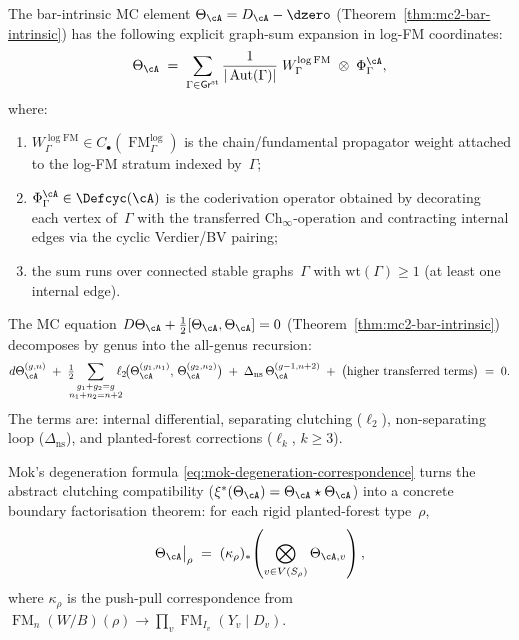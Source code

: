 \begin{construction}
\label{const:vol1-graph-sum-theta-logfm}
The bar-intrinsic MC element $\Theta_\cA = D_\cA - \dzero$
(Theorem~\ref{thm:mc2-bar-intrinsic}) has the following explicit
graph-sum expansion in log-FM coordinates:
\begin{equation}\label{eq:theta-graph-sum-logfm}
\Theta_\cA
\;=\;
\sum_{\Gamma \in \mathsf{Gr}^{\mathrm{st}}}
\frac{1}{|\operatorname{Aut}(\Gamma)|}
\;W_\Gamma^{\log\mathrm{FM}}
\;\otimes\;
\Phi_\Gamma^\cA,
\end{equation}
where:
\begin{enumerate}[label=\textup{(\alph*)}]
\item $W_\Gamma^{\log\mathrm{FM}} \in
  C_\bullet(\operatorname{FM}^{\log}_\Gamma)$ is the
  chain/fundamental propagator weight attached to the log-FM
  stratum indexed by~$\Gamma$;
\item $\Phi_\Gamma^\cA \in \Defcyc(\cA)$ is the coderivation
  operator obtained by decorating each vertex of~$\Gamma$ with the
  transferred $\mathrm{Ch}_\infty$-operation and contracting
  internal edges via the cyclic Verdier/BV pairing;
\item the sum runs over connected stable graphs~$\Gamma$ with
  $\mathrm{wt}(\Gamma) \geq 1$ (at least one internal edge).
\end{enumerate}
The MC equation $D\Theta_\cA + \tfrac{1}{2}[\Theta_\cA,\Theta_\cA]
= 0$ \textup{(}Theorem~\textup{\ref{thm:mc2-bar-intrinsic})}
decomposes by genus into the all-genus recursion:
\begin{equation}\label{eq:all-genus-recursion-logfm}
d\Theta_\cA^{(g,n)}
\;+\;
\tfrac{1}{2}
\!\!\!\!
\sum_{\substack{g_1 + g_2 = g \\ n_1 + n_2 = n + 2}}
\!\!\!\!
\ell_2\!\bigl(\Theta_\cA^{(g_1,n_1)},\,
\Theta_\cA^{(g_2,n_2)}\bigr)
\;+\;
\Delta_{\mathrm{ns}}\, \Theta_\cA^{(g-1,n+2)}
\;+\;
\bigl(\text{higher transferred terms}\bigr)
\;=\; 0.
\end{equation}
The terms are: internal differential, separating clutching
($\ell_2$), non-separating loop ($\Delta_{\mathrm{ns}}$),
and planted-forest corrections ($\ell_k$, $k \geq 3$).
\end{construction}

\begin{construction}
\label{const:vol1-clutching-law-logfm}
Mok's degeneration formula
\eqref{eq:mok-degeneration-correspondence} turns the abstract
clutching compatibility
($\xi^*(\Theta_\cA) = \Theta_\cA \star \Theta_\cA$) into a
concrete boundary factorisation theorem: for each rigid
planted-forest type~$\rho$,
\begin{equation}\label{eq:clutching-logfm}
\Theta_\cA\big|_\rho
\;=\;
(\kappa_\rho)_*\!
\left(
\bigotimes_{v \in V(S_\rho)}
\Theta_{\cA,v}
\right),
\end{equation}
where $\kappa_\rho$ is the push-pull correspondence from
$\operatorname{FM}_n(W/B)(\rho) \to
\prod_v \operatorname{FM}_{I_v}(Y_v \mathbin{|} D_v)$.
\end{construction}

